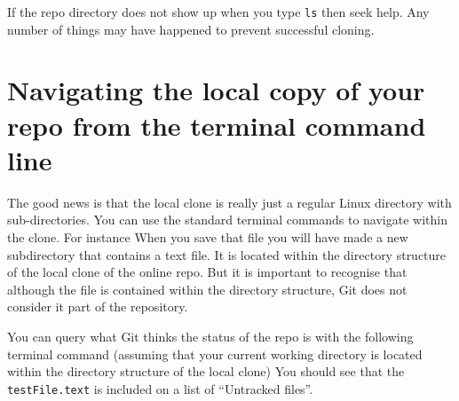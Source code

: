 
\noindent If the repo directory does not show up when you type \verb|ls| then seek help. Any number of things may have happened to prevent successful cloning.

\section{Navigating the local copy of your repo from the terminal command line}

The good news is that the local clone is really just a regular Linux directory with sub-directories. You can use the standard terminal commands to navigate within the clone. For instance
\noindent When you save that file you will have made a new subdirectory that contains a text file. It is located within the directory structure of the local clone of the online repo. But it is important to recognise that although the file is contained within the directory structure, Git does not consider it part of the repository. 

You can query what Git thinks the status of the repo is with the following terminal command (assuming that your current working directory is located within the directory structure of the local clone)
\noindent You should see that the \verb|testFile.text| is included on a list of ``Untracked files''. 

